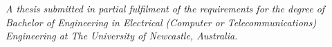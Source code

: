 \begin{titlepage}
    \vfill
    
    \emph{A thesis submitted in partial fulfilment of the requirements for the degree of Bachelor of Engineering in Electrical (Computer or Telecommunications) Engineering at The University of Newcastle, Australia.}
    
    \vfill
\end{titlepage}

